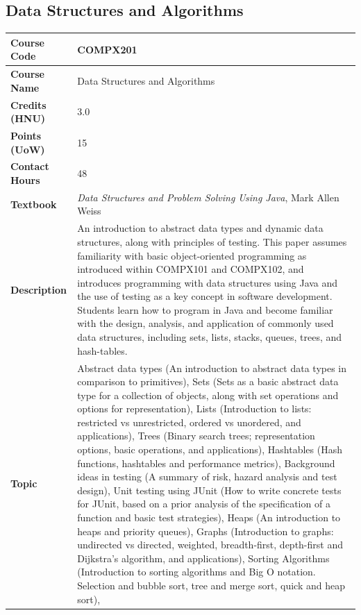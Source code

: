 \documentclass{article}
\begin{document}
\subsection[COMPX201 Data Structures and Algorithms]{Data Structures and Algorithms}
\renewcommand{\arraystretch}{1.5} %
\begin{longtable}{|p{3cm}|p{10cm}|}
\hline
\textbf{Course Code} & COMPX201 \\
\hline
\textbf{Course Name} & Data Structures and Algorithms \\
\hline
\textbf{Credits (HNU)} & 3.0 \\
\hline
\textbf{Points (UoW)} & 15 \\
\hline
\textbf{Contact Hours} & 48 \\
\hline
\textbf{Textbook} & \emph{Data Structures and Problem Solving Using Java}, Mark Allen Weiss \\
\hline
\textbf{Description} & An introduction to abstract data types and dynamic data structures, along with principles of testing. This paper assumes familiarity with basic object-oriented programming as introduced within COMPX101 and COMPX102, and introduces programming with data structures using Java and the use of testing as a key concept in software development. Students learn how to program in Java and become familiar with the design, analysis, and application of commonly used data structures, including sets, lists, stacks, queues, trees, and hash-tables.\\
\hline
\textbf{Topic} & Abstract data types
(An introduction to abstract data types in comparison to primitives), 
Sets
(Sets as a basic abstract data type for a collection of objects, along with set operations and options for representation), 
Lists
(Introduction to lists: restricted vs unrestricted, ordered vs unordered, and applications), 
Trees
(Binary search trees; representation options, basic operations, and applications), 
Hashtables
(Hash functions, hashtables and performance metrics), 
Background ideas in testing
(A summary of risk, hazard analysis and test design), 
Unit testing using JUnit
(How to write concrete tests for JUnit, based on a prior analysis of the specification of a function and basic test strategies), 
Heaps
(An introduction to heaps and priority queues), 
Graphs
(Introduction to graphs: undirected vs directed, weighted, breadth-first, depth-first and Dijkstra's algorithm, and applications), 
Sorting Algorithms
(Introduction to sorting algorithms and Big O notation. Selection and bubble sort, tree and merge sort, quick and heap sort), 

\end{longtable}
\end{document}
